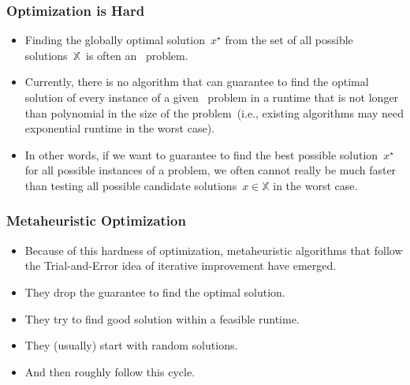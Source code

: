\documentclass[aspectratio=169,mathserif,notheorems]{beamer}%
\gdef\searchSpace{\ensuremath{\mathbb{X}}}%
\gdef\sespel{\ensuremath{x}}%
\gdef\opti#1{\ensuremath{#1^{\star}}}%
\begin{document}
\begin{frame}[t]%
\frametitle{Optimization is Hard}%
\begin{itemize}%
%
\item Finding the globally optimal solution~\opti{\sespel} from the set of all possible solutions~\searchSpace\ is often an \npHard\ problem.%
%
\item<2-> Currently, there is no algorithm that can \alert{guarantee} to find the optimal solution of \alert{every instance} of a given \npHard\ problem in a runtime that is not longer than polynomial in the size of the problem~(i.e., existing algorithms may need exponential runtime in the \alert{worst case}).%
%
\item<4-> In other words, if we want to guarantee to find the best possible solution~\opti{\sespel} for all possible instances of a problem, we often cannot really be much faster than testing all possible candidate solutions~$\sespel\in\searchSpace$ in the \alert{worst case}.%
%
\end{itemize}%
%
%
%
\end{frame}%
%
\begin{frame}%
\frametitle{Metaheuristic Optimization}%
\parbox{0.42\paperwidth}{%
\begin{itemize}%
%
\item Because of this hardness of optimization, metaheuristic algorithms that follow the Trial-and-Error idea of iterative improvement have emerged.%
\item<2-> They drop the guarantee to find the optimal solution.%
\item<3-> They try to find good solution within a feasible runtime.%
\item<4-> They (usually) start with random solutions.%
\item<5-> And then roughly follow this cycle.%
%
\end{itemize}%
}%
%
%
%
%
%
%
%
%
%
%
%
%
%
%
%
\end{frame}%
\end{document}

